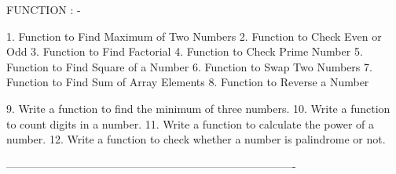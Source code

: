 FUNCTION : -

1. Function to Find Maximum of Two Numbers
2. Function to Check Even or Odd
3. Function to Find Factorial
4. Function to Check Prime Number
5. Function to Find Square of a Number
6. Function to Swap Two Numbers
7. Function to Find Sum of Array Elements
8. Function to Reverse a Number

9. Write a function to find the minimum of three numbers.
10. Write a function to count digits in a number.
11. Write a function to calculate the power of a number.
12. Write a function to check whether a number is palindrome or not.

-------------------------------------------------------------------------------
